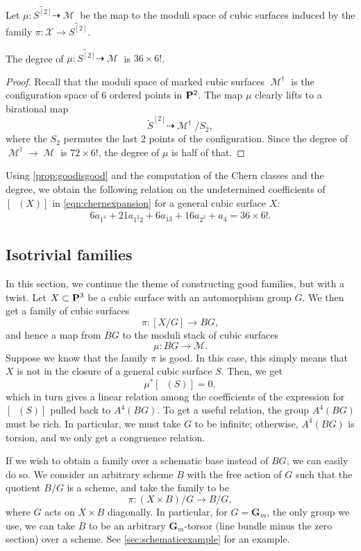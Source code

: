\documentclass[11pt,reqno, letterpaper]{amsart}
\DeclareMathOperator{\Orb}{\overline{Orb}}
\DeclareMathOperator{\M}{\mathcal{M}}
\renewcommand{\to}{{\longrightarrow}}
\numberwithin{equation}{section}
\newcommand{\G}{\mathbf G}
\begin{document}
Let $\mu \colon \widetilde{S^{[2]}} \dashrightarrow \M$ be the map to the moduli space of cubic surfaces induced by the family $\pi \colon \mathcal X \to \widetilde{S^{[2]}}$.
\begin{proposition}
  The degree of $\mu \colon \widetilde{S^{[2]}} \dashrightarrow \M$ is $36 \times 6!$.
\end{proposition}
\begin{proof}
  Recall that the moduli space of marked cubic surfaces $\M^\dagger$ is the configuration space of 6 ordered points in $\P^2$.
  The map $\mu$ clearly lifts to a birational map
  \[ \widetilde S^{[2]} \dashrightarrow \M^\dagger / S_2,\]
  where the $S_2$ permutes the last 2 points of the configuration.
  Since the degree of $\M^\dagger \to \M$ is  $72 \times 6!$, the degree of $\mu$ is half of that.
\end{proof}

Using \autoref{prop:goodisgood} and the computation of the Chern classes and the degree, we obtain the following relation on the undetermined coefficients of $[\Orb(X)]$ in
\eqref{eqn:chernexpansion} for a general cubic surface $X$:
\begin{align}
  \label{eq:relation4}
  6 a_{1^{4}} + 21 a_{1^{2}2} + 6a_{13} + 16a_{2^2}+  a_{4} = 36 \times 6!.
\end{align}

\subsection{Isotrivial families}
In this section, we continue the theme of constructing good families, but with a twist.
Let $X \subset \P^3$ be a cubic surface with an automorphism group $G$.
We then get a family of cubic surfaces
\[ \pi \colon [X/G] \to BG,\]
and hence a map from $BG$ to the moduli stack of cubic surfaces
\[ \mu \colon BG \to \mathscr M.\]
Suppose we know that the family $\pi$ is good.
In this case, this simply means that $X$ is not in the closure of a general cubic surface $S$.
Then, we get
\[ \mu^* [\Orb(S)] = 0,\]
which in turn gives a linear relation among the coefficients of the expression for $[\Orb(S)]$ pulled back to $A^4(BG)$.
To get a useful relation, the group $A^4(BG)$ must be rich.
In particular, we must take $G$ to be infinite; otherwise, $A^4(BG)$ is torsion, and we only get a congruence relation.

If we wish to obtain a family over a schematic base instead of $BG$, we can easily do so.
We consider an arbitrary scheme $B$ with the free action of $G$ such that the quotient $B/G$ is a scheme, and take the family to be
\[ \pi \colon (X \times B)/G \to B/G,\]
where $G$ acts on $X \times B$ diagonally.
In particular, for $G = \G_m$, the only group we use, we can take $B$ to be an arbitrary $\G_m$-torsor (line bundle minus the zero section) over a scheme.
See \autoref{sec:schematicexample} for an example.
\end{document}
